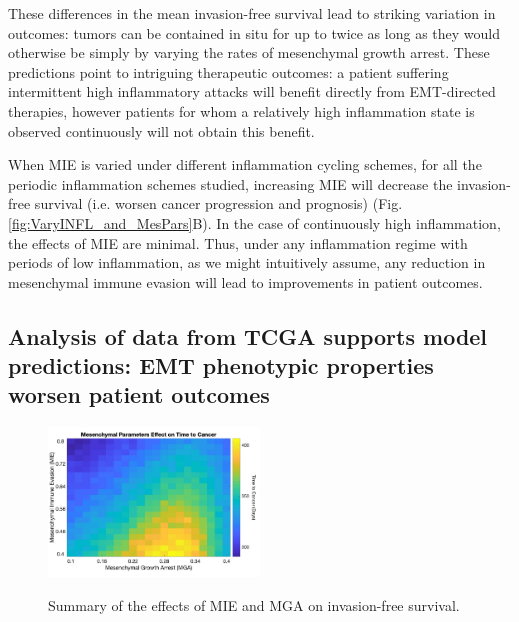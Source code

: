 \documentclass[11pt]{article}
\begin{document}

\par
These differences in the mean invasion-free survival lead to striking variation in outcomes: tumors can be contained in situ for up to twice as long as they would otherwise be simply by varying the rates of mesenchymal growth arrest. These predictions point to intriguing therapeutic outcomes: a patient suffering intermittent high inflammatory attacks will benefit directly from EMT-directed therapies, however patients for whom a relatively high inflammation state is observed continuously will not obtain this benefit.
\par
When MIE is varied under different inflammation cycling schemes, for all the periodic inflammation schemes studied, increasing MIE will decrease the invasion-free survival (i.e. worsen cancer progression and prognosis)  (Fig. \ref{fig:VaryINFL_and_MesPars}B). In the case of continuously high inflammation, the effects of MIE are minimal. Thus, under any inflammation regime with periods of low inflammation, as we might intuitively assume, any reduction in mesenchymal immune evasion will lead to improvements in patient outcomes.


\subsection{Analysis of data from TCGA supports model predictions: EMT phenotypic properties worsen patient outcomes}\label{tcga}

\begin{figure}
\center
{\includegraphics[width=0.5\textwidth]{Figure5/heatmap2.jpg}}
\caption{Summary of the effects of MIE and MGA on invasion-free survival.
}
\label{fig:MIEvsMGA}
\end{figure}
\end{document}
